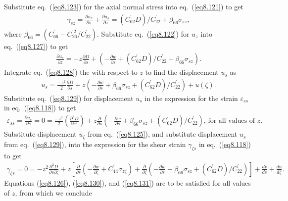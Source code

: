 \documentclass{AeroStructure-ERJohnson}
\begin{document}
Substitute
eq.~(\ref{eq8.123}) for the axial normal stress into
eq.~(\ref{eq8.121}) to get
\begin{align}\label{eq8.127}
\gamma_{s z}=\frac{\partial u_{z}}{\partial s}+\frac{\partial
u_{s}}{\partial z}=\left(C_{62}^{\prime} D\right)/
C_{22}^{\prime}+\beta_{66} \sigma_{s z},
\end{align}
where $\beta_{66}=\left(C_{66}^{\prime}-C_{26}^{\prime 2}/
C_{22}^{\prime}\right)$. Substitute eq.~(\ref{eq8.122}) for
$u_{z}$ into eq.~(\ref{eq8.127}) to get
\begin{align}\label{eq8.128}
\frac{\partial u_{s}}{\partial z}=-z \frac{\partial D}{\partial
s}+\left(-\frac{\partial w}{\partial s}+\left(C_{62}^{\prime}
D\right)/ C_{22}^{\prime}+\beta_{66} \sigma_{s z}\right).
\end{align}
Integrate eq.~(\ref{eq8.128}) the with respect to $z$ to find the
displacement $u_{s}$ as
\begin{align}\label{eq8.129}
u_{s}=\frac{-z^{2}}{2} \frac{\partial D}{\partial
s}+z\left(-\frac{\partial w}{\partial s}+\beta_{66} \sigma_{s
z}+\left(C_{62}^{\prime} D\right)/
C_{22}^{\prime}\right)+u(\zeta).
\end{align}
Substitute eq.~(\ref{eq8.129}) for displacement $u_{s}$ in the
expression for the strain $\varepsilon_{s s}$ in
eq.~(\ref{eq8.118}) to get
\begin{align}\label{eq8.130}
\varepsilon_{s s}=\frac{\partial u_{s}}{\partial
s}=0=\frac{-z^{2}}{2}\left(\frac{\partial^{2} D}{\partial
s^{2}}\right)+z \frac{\partial}{\partial s}\left(-\frac{\partial
w}{\partial s}+\beta_{66} \sigma_{s z}+\left(C_{62}^{\prime}
D\right)/ C_{22}^{\prime}\right)\mbox{, for all values of $z$.}
\end{align}
Substitute displacement $u_{\zeta}$ from
eq.~(\ref{eq8.125}), and substitute displacement $u_{s}$ from
eq.~(\ref{eq8.129}), into the expression for the shear strain
$\gamma_{\zeta s}$ in eq.~(\ref{eq8.118}) to get
\begin{align}\label{eq8.131}
\gamma_{\zeta s}=0=-z^{2} \frac{\partial^{2} D}{\partial s
\partial \zeta}+z\left[\frac{\partial}{\partial
s}\left(-\frac{\partial w}{\partial \zeta}+C_{44}^{\prime}
\sigma_{z \zeta}\right)+\frac{\partial}{\partial
\zeta}\left(-\frac{\partial w}{\partial s}+\beta_{66} \sigma_{s
z}+\left(C_{62}^{\prime} D\right)/ C^{\prime}_{22}\right)\right]+\frac{d v}{d s}+\frac{d u}{d \zeta}.
\end{align}
Equations (\ref{eq8.126}), (\ref{eq8.130}), and (\ref{eq8.131})
are to be satisfied for all values of $z$, from which we conclude
\end{document}
